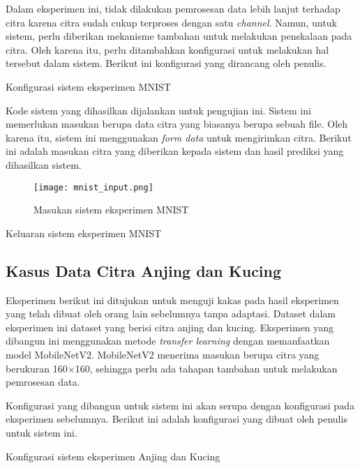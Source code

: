 Dalam eksperimen ini, tidak dilakukan pemrosesan data lebih lanjut terhadap citra karena citra sudah cukup terproses dengan satu \textit{channel}.
Namun, untuk sistem, perlu diberikan mekanisme tambahan untuk melakukan penskalaan pada citra.
Oleh karena itu, perlu ditambahkan konfigurasi untuk melakukan hal tersebut dalam sistem.
Berikut ini konfigurasi yang dirancang oleh penulis.

\begin{code}
	\caption{Konfigurasi sistem eksperimen MNIST}\label{listing:26}
\end{code}

Kode sistem yang dihasilkan dijalankan untuk pengujian ini.
Sistem ini memerlukan masukan berupa data citra yang biasanya berupa sebuah file.
Oleh karena itu, sistem ini menggunakan \textit{form data} untuk mengirimkan citra.
Berikut ini adalah masukan citra yang diberikan kepada sistem dan hasil prediksi yang dihasilkan sistem.

\begin{figure}[H]
    \centering
    \texttt{[image: mnist\_input.png]}
    \caption{Masukan sistem eksperimen MNIST}\label{fig:mnist-input}
\end{figure}

\begin{code}
	\caption{Keluaran sistem eksperimen MNIST}\label{listing:27}
\end{code}

\subsection{Kasus Data Citra Anjing dan Kucing}

Eksperimen berikut ini ditujukan untuk menguji kakas pada hasil eksperimen yang telah dibuat oleh orang lain sebelumnya tanpa adaptasi.
Dataset dalam eksperimen ini dataset yang berisi citra anjing dan kucing.
Eksperimen yang dibangun ini menggunakan metode \textit{transfer learning} dengan memanfaatkan model MobileNetV2.
MobileNetV2 menerima masukan berupa citra yang berukuran 160\(\times\)160, sehingga perlu ada tahapan tambahan untuk melakukan pemrosesan data.

Konfigurasi yang dibangun untuk sistem ini akan serupa dengan konfigurasi pada eksperimen sebelumnya.
Berikut ini adalah konfigurasi yang dibuat oleh penulis untuk sistem ini.

\begin{code}
	\caption{Konfigurasi sistem eksperimen Anjing dan Kucing}\label{listing:28}
\end{code}

